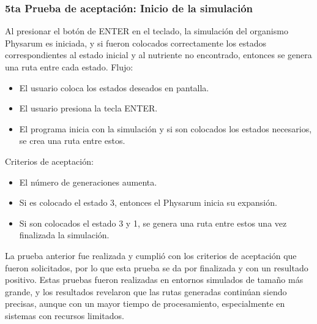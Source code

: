     \subsubsection{5ta Prueba de aceptaci\'on: Inicio de la simulaci\'on}
    Al presionar el bot\'on de ENTER en el teclado, la simulaci\'on del organismo Physarum es iniciada, y si fueron colocados
        correctamente los estados correspondientes al estado inicial
        y al nutriente no encontrado, entonces se genera una ruta
        entre cada estado.
    \vskip 0.5cm
    Flujo:
    \begin{itemize}
        \item El usuario coloca los estados deseados en pantalla.
        \item El usuario presiona la tecla ENTER.
        \item El programa inicia con la simulaci\'on y si son colocados
        los estados necesarios, se crea una ruta entre estos.
    \end{itemize}
    \vskip 0.5cm
    Criterios de aceptaci\'on:
    \begin{itemize}
        \item El n\'umero de generaciones aumenta.
        \item Si es colocado el estado 3, entonces el Physarum inicia
        su expansi\'on.
        \item Si son colocados el estado 3 y 1, se genera una ruta entre
        estos una vez finalizada la simulaci\'on.
    \end{itemize}
    \vskip 0.5cm
    La prueba anterior fue realizada y cumpli\'o con los criterios
        de aceptaci\'on que fueron solicitados, por lo que esta prueba
        se da por finalizada y con un resultado positivo.
    \vskip 0.5cm
    Estas pruebas fueron realizadas en entornos simulados de
        tama\~no m\'as grande, y los resultados revelaron que las rutas
        generadas contin\'uan siendo precisas, aunque con un mayor
        tiempo de procesamiento, especialmente en sistemas con
        recursos limitados.